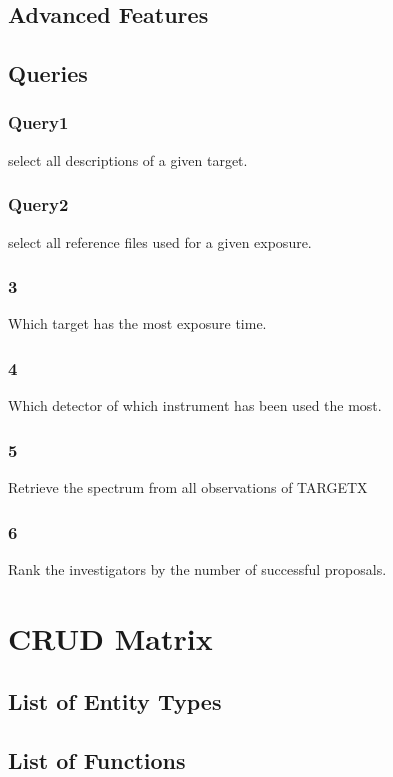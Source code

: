 \documentclass[a4paper,11pt]{article}
\begin{document}
\subsection{Advanced Features}
\subsection{Queries}

\subsubsection{Query1}
select all descriptions of a given target.

\subsubsection{Query2}
select all reference files used for a given exposure.

\subsubsection{3}
Which target has the most exposure time.

\subsubsection{4}
Which detector of which instrument has been used the most.

\subsubsection{5}
Retrieve the spectrum from all observations of TARGETX

\subsubsection{6}
Rank the investigators by the number of successful proposals.

\section{CRUD Matrix}

\subsection{List of Entity Types}
\subsection{List of Functions}
\end{document}
